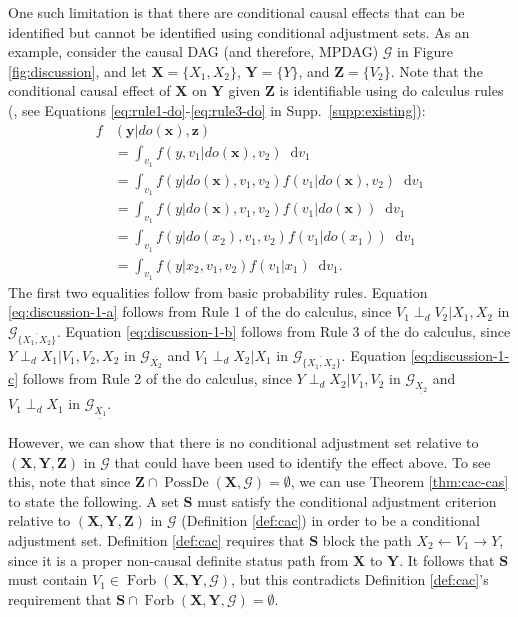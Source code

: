 \documentclass[twoside]{article}
\DeclareMathOperator{\PossDe}{PossDe}
\DeclareMathOperator{\Forb}{Forb}
\newcommand{\fb}[2][X,Y]{\Forb(\mb{#1},#2)}
\newcommand{\mb}[1]{\mathbf{#1}}
\newcommand{\dsepp}{\perp_{d}}
\newcommand{\g}[1][G]{\mathcal{#1}}
\newcommand*\diff{\mathop{}\!\mathrm{d}}
\begin{document}
One such limitation is that there are conditional causal effects that can be identified but cannot be identified using conditional adjustment sets. As an example, consider the causal DAG (and therefore, MPDAG) $\g$ in Figure \ref{fig:discussion}, and let $\mb{X} = \{X_1, X_2\}$, $\mb{Y}=\{Y\}$, and $\mb{Z}=\{V_2\}$. Note that the conditional causal effect of $\mb{X}$ on $\mb{Y}$ given $\mb{Z}$ is identifiable using do calculus rules (\citealp{pearl2009causality}, see Equations \eqref{eq:rule1-do}-\eqref{eq:rule3-do} in Supp.\ \ref{supp:existing}):
\begingroup
\allowdisplaybreaks
\begin{align}
    f&(\mb{y}|do(\mb{x}),\mb{z}) \nonumber\\
            &= \int_{v_1} f(y,v_1|do(\mb{x}),v_2) \diff v_1 \nonumber \\
            &= \int_{v_1} f(y|do(\mb{x}),v_1,v_2) f(v_1|do(\mb{x}),v_2) \diff v_1 \nonumber \\
            &= \int_{v_1} f(y|do(\mb{x}),v_1,v_2) f(v_1|do(\mb{x})) \diff v_1 \label{eq:discussion-1-a} \\
            &= \int_{v_1} f(y|do(x_2),v_1,v_2) f(v_1|do(x_1)) \diff v_1 \label{eq:discussion-1-b} \\
            &= \int_{v_1} f(y|x_2,v_1,v_2) f(v_1|x_1) \diff v_1. \label{eq:discussion-1-c}
\end{align}
The first two equalities follow from basic probability rules. Equation \eqref{eq:discussion-1-a} follows from Rule 1 of the do calculus, since $V_1 \dsepp V_2 | X_1,X_2$ in $\g_{\overline{\{X_1,X_2\}}}$. Equation \eqref{eq:discussion-1-b} follows from Rule 3 of the do calculus, since $Y \dsepp X_1 | V_1,V_2,X_2$ in $\g_{\overline{X_2}}$ and $V_1 \dsepp X_2 | X_1$ in $\g_{\overline{\{X_1,X_2\}}}$. Equation \eqref{eq:discussion-1-c} follows from Rule 2 of the do calculus, since $Y \dsepp X_2 | V_1,V_2$ in $\g_{\underline{X_2}}$ and $V_1 \dsepp X_1$ in $\g_{\underline{X_1}}$.

However, we can show that there is no conditional adjustment set relative to $(\mb{X},\mb{Y},\mb{Z})$ in $\g$ that could have been used to identify the effect above. To see this, note that since $\mb{Z} \cap \PossDe(\mb{X}, \g) = \emptyset$, we can use Theorem \ref{thm:cac-cas} to state the following. A set $\mb{S}$ must satisfy the conditional adjustment criterion relative to $(\mb{X},\mb{Y},\mb{Z})$ in $\g$ (Definition \ref{def:cac}) in order to be a conditional adjustment set. Definition \ref{def:cac} requires that $\mb{S}$ block the path $X_2 \gets V_1 \to Y$, since it is a proper non-causal definite status path from $\mb{X}$ to $\mb{Y}$. It follows that $\mb{S}$ must contain $V_1 \in \fb{\g}$, but this contradicts Definition \ref{def:cac}'s requirement that $\mb{S} \cap \fb{\g} = \emptyset$. 
\end{document}
